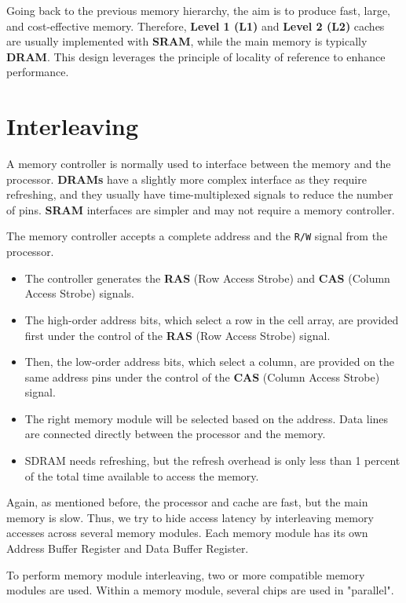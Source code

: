 Going back to the previous memory hierarchy, the aim is to produce fast, large, and cost-effective memory. Therefore, \textbf{Level 1 (L1)} and \textbf{Level 2 (L2)} caches are usually implemented with \textbf{SRAM}, while the main memory is typically \textbf{DRAM}. This design leverages the principle of locality of reference to enhance performance.

\section{Interleaving}
A memory controller is normally used to interface between the memory and the processor. \textbf{DRAMs} have a slightly more complex interface as they require refreshing, and they usually have time-multiplexed signals to reduce the number of pins. \textbf{SRAM} interfaces are simpler and may not require a memory controller.

The memory controller accepts a complete address and the \texttt{R/W} signal from the processor.
\begin{itemize}
    \item The controller generates the \textbf{RAS} (Row Access Strobe) and \textbf{CAS} (Column Access Strobe) signals.
    \item The high-order address bits, which select a row in the cell array, are provided first under the control of the \textbf{RAS} (Row Access Strobe) signal.
    \item Then, the low-order address bits, which select a column, are provided on the same address pins under the control of the \textbf{CAS} (Column Access Strobe) signal.
    \item The right memory module will be selected based on the address. Data lines are connected directly between the processor and the memory.
    \item SDRAM needs refreshing, but the refresh overhead is only less than 1 percent of the total time available to access the memory.
\end{itemize}

Again, as mentioned before, the processor and cache are fast, but the main memory is slow. Thus, we try to hide access latency by interleaving memory accesses across several memory modules. Each memory module has its own Address Buffer Register and Data Buffer Register.

To perform memory module interleaving, two or more compatible memory modules are used. Within a memory module, several chips are used in "parallel".

